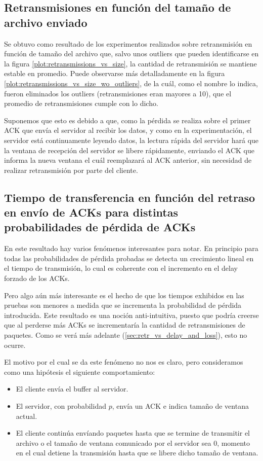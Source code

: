 \documentclass[a4paper, 10pt, twoside]{article}
\begin{document}
\subsection{Retransmisiones en función del tamaño de archivo enviado}

Se obtuvo como resultado de los experimentos realizados sobre retransmisión en función de tamaño del archivo que, salvo unos outliers que pueden identificarse en la figura \ref{plot:retransmissions_vs_size}, la cantidad de retransmisión se mantiene estable en promedio. Puede observarse más detalladamente en la figura \ref{plot:retransmissions_vs_size_wo_outliers}, de la cuál, como el nombre lo indica, fueron eliminados los outliers (retransmisiones eran mayores a 10), que el promedio de retransmisiones cumple con lo dicho.

Suponemos que esto es debido a que, como la pérdida se realiza sobre el primer ACK que envía el servidor al recibir los datos, y como en la experimentación, el servidor está continuamente leyendo datos, la lectura rápida del servidor hará que la ventana de recepción del servidor se libere rápidamente, enviando el ACK que informa la nueva ventana el cuál reemplazará al ACK anterior, sin necesidad de realizar retransmisión por parte del cliente.

\subsection{Tiempo de transferencia en función del retraso en envío de ACKs para distintas probabilidades de pérdida de ACKs}

En este resultado hay varios fenómenos interesantes para notar. En principio para todas las probabilidades de pérdida probadas se detecta un crecimiento lineal en el tiempo de transmisión, lo cual es coherente con el incremento en el delay forzado de los ACKs.

Pero algo aún más interesante es el hecho de que los tiempos exhibidos en las pruebas son menores a medida que se incrementa la probabilidad de pérdida introducida. Este resultado es una noción anti-intuitiva, puesto que podría creerse que al perderse más ACKs se incrementaría la cantidad de retransmisiones de paquetes. Como se verá más adelante (\ref{sec:retr_vs_delay_and_loss}), esto no ocurre.

El motivo por el cual se da este fenómeno no nos es claro, pero consideramos como una hipótesis el siguiente comportamiento:

\begin{itemize}
  \item El cliente envía el buffer al servidor.
  \item El servidor, con probabilidad $p$, envía un ACK e indica tamaño de ventana actual.
  \item El cliente continúa envíando paquetes hasta que se termine de transmitir el archivo o el tamaño de ventana comunicado por el servidor sea 0, momento en el cual detiene la transmisión hasta que se libere dicho tamaño de ventana.
\end{itemize}
\end{document}
